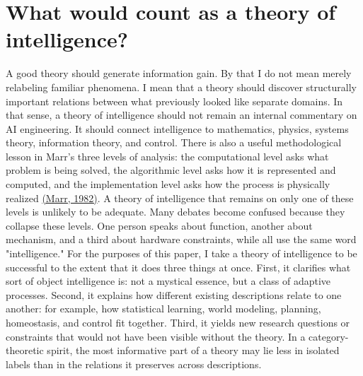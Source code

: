 \documentclass[11pt]{article}
\newcommand{\citejump}[2]{\hyperref[#1]{(#2)}}
\begin{document}
\section{What would count as a theory of intelligence?}
A good theory should generate information gain. By that I do not mean merely relabeling familiar phenomena. I mean that a theory should discover structurally important relations between what previously looked like separate domains. In that sense, a theory of intelligence should not remain an internal commentary on AI engineering. It should connect intelligence to mathematics, physics, systems theory, information theory, and control. There is also a useful methodological lesson in Marr's three levels of analysis: the computational level asks what problem is being solved, the algorithmic level asks how it is represented and computed, and the implementation level asks how the process is physically realized \citejump{ref:marr1982}{Marr, 1982}. A theory of intelligence that remains on only one of these levels is unlikely to be adequate. Many debates become confused because they collapse these levels. One person speaks about function, another about mechanism, and a third about hardware constraints, while all use the same word "intelligence." For the purposes of this paper, I take a theory of intelligence to be successful to the extent that it does three things at once. First, it clarifies what sort of object intelligence is: not a mystical essence, but a class of adaptive processes. Second, it explains how different existing descriptions relate to one another: for example, how statistical learning, world modeling, planning, homeostasis, and control fit together. Third, it yields new research questions or constraints that would not have been visible without the theory. In a category-theoretic spirit, the most informative part of a theory may lie less in isolated labels than in the relations it preserves across descriptions.
\end{document}
